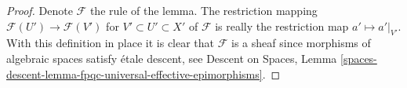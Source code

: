 \documentclass[10pt,a4paper]{amsart}
\theoremstyle{plain}
\theoremstyle{definition}
\theoremstyle{remark}
\numberwithin{equation}{subsection}
\begin{document}
\begin{proof}
Denote $\mathcal{F}$ the rule of the lemma.
The restriction mapping $\mathcal{F}(U') \to \mathcal{F}(V')$ for
$V' \subset U' \subset X'$
of $\mathcal{F}$ is really the restriction map $a' \mapsto a'|_{V'}$.
With this definition in place it is clear that $\mathcal{F}$ is a
sheaf since morphisms of algebraic spaces satisfy \'etale descent, see
Descent on Spaces,
Lemma \ref{spaces-descent-lemma-fpqc-universal-effective-epimorphisms}.
\end{proof}
\end{document}
